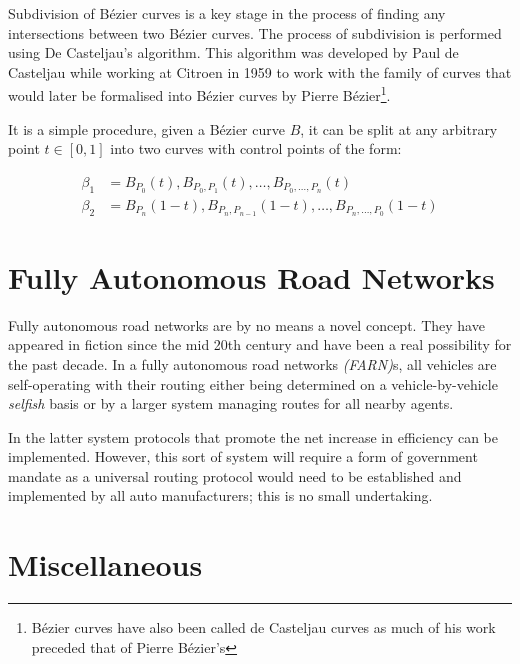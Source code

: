 Subdivision of Bézier curves is a key stage in the process of finding any intersections between two Bézier curves. The process of subdivision is performed using De Casteljau's algorithm. This algorithm was developed by Paul de Casteljau while working at Citroen in 1959 to work with the family of curves that would later be formalised into Bézier curves by Pierre Bézier\footnote{Bézier curves have also been called de Casteljau curves as much of his work preceded that of Pierre Bézier's}.

It is a simple procedure, given a Bézier curve $B$, it can be split at any arbitrary point $t \in [0,1]$ into two curves with control points of the form:

\begin{align}
  \beta_{1} &= B_{P_{0}}(t), B_{P_{0},P_1}(t), \ldots, B_{P_{0},\ldots,P_{n}}(t) \\
  \beta_{2} &= B_{P_{n}}(1-t), B_{P_{n},P_{n-1}}(1-t), \ldots, B_{P_{n},\ldots,P_{0}}(1-t)
\end{align}


\section{Fully Autonomous Road Networks}

Fully autonomous road networks are by no means a novel concept. They have appeared in fiction since the mid 20th century and have been a real possibility for the past decade. In a fully autonomous road networks \textit{(FARN)}s, all vehicles are self-operating with their routing either being determined on a vehicle-by-vehicle \textit{selfish} basis or by a larger system managing routes for all nearby agents. 

In the latter system protocols that promote the net increase in efficiency can be implemented. However, this sort of system will require a form of government mandate as a universal routing protocol would need to be established and implemented by all auto manufacturers; this is no small undertaking.

\section{Miscellaneous}

